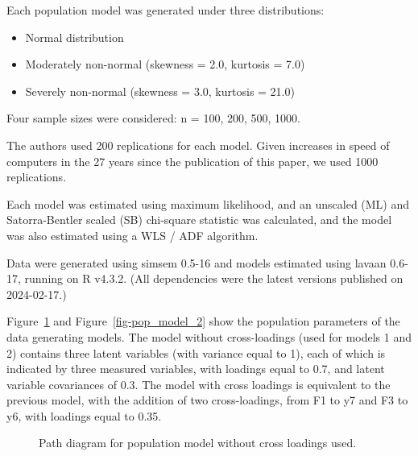 \documentclass[
  letterpaper,
  DIV=11,
  numbers=noendperiod]{scrartcl}
\providecommand{\tightlist}{%
  \setlength{\itemsep}{0pt}\setlength{\parskip}{0pt}}\usepackage{longtable,booktabs,array}
\begin{document}
Each population model was generated under three distributions:

\begin{itemize}
\tightlist
\item
  Normal distribution
\item
  Moderately non-normal (skewness = 2.0, kurtosis = 7.0)
\item
  Severely non-normal (skewness = 3.0, kurtosis = 21.0)
\end{itemize}

Four sample sizes were considered: n = 100, 200, 500, 1000.

The authors used 200 replications for each model. Given increases in
speed of computers in the 27 years since the publication of this paper,
we used 1000 replications.

Each model was estimated using maximum likelihood, and an unscaled (ML)
and Satorra-Bentler scaled (SB) chi-square statistic was calculated, and
the model was also estimated using a WLS / ADF algorithm.

Data were generated using simsem 0.5-16 and models estimated using
lavaan 0.6-17, running on R v4.3.2. (All dependencies were the latest
versions published on 2024-02-17.)

Figure~\ref{fig-pop_model_1} and Figure~\ref{fig-pop_model_2} show the
population parameters of the data generating models. The model without
cross-loadings (used for models 1 and 2) contains three latent variables
(with variance equal to 1), each of which is indicated by three measured
variables, with loadings equal to 0.7, and latent variable covariances
of 0.3. The model with cross loadings is equivalent to the previous
model, with the addition of two cross-loadings, from F1 to y7 and F3 to
y6, with loadings equal to 0.35.

\begin{figure}[H]


\caption{\label{fig-pop_model_1}Path diagram for population model
without cross loadings used.}

\end{figure}%
\end{document}
